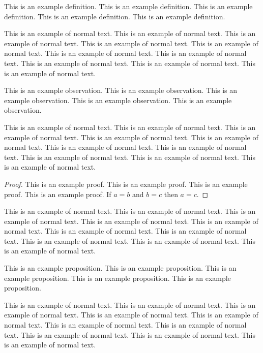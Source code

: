 \begin{refsection}
\begin{definition}
  This is an example definition.
  This is an example definition.
  This is an example definition.
  This is an example definition.
  This is an example definition.
\end{definition}

This is an example of normal text.
This is an example of normal text.
This is an example of normal text.
This is an example of normal text.
This is an example of normal text.
This is an example of normal text.
This is an example of normal text.
This is an example of normal text.
This is an example of normal text.
This is an example of normal text.

\begin{observation}
  This is an example observation.
  This is an example observation.
  This is an example observation.
  This is an example observation.
  This is an example observation.
\end{observation}

This is an example of normal text.
This is an example of normal text.
This is an example of normal text.
This is an example of normal text.
This is an example of normal text.
This is an example of normal text.
This is an example of normal text.
This is an example of normal text.
This is an example of normal text.
This is an example of normal text.

\begin{proof}
  This is an example proof.
  This is an example proof.
  This is an example proof.
  This is an example proof.
  If \(a = b\) and \(b = c\) then \(a = c\).
\end{proof}

This is an example of normal text.
This is an example of normal text.
This is an example of normal text.
This is an example of normal text.
This is an example of normal text.
This is an example of normal text.
This is an example of normal text.
This is an example of normal text.
This is an example of normal text.
This is an example of normal text.

\begin{proposition}
  This is an example proposition.
  This is an example proposition.
  This is an example proposition.
  This is an example proposition.
  This is an example proposition.
\end{proposition}

This is an example of normal text.
This is an example of normal text.
This is an example of normal text.
This is an example of normal text.
This is an example of normal text.
This is an example of normal text.
This is an example of normal text.
This is an example of normal text.
This is an example of normal text.
This is an example of normal text.


\end{refsection}
